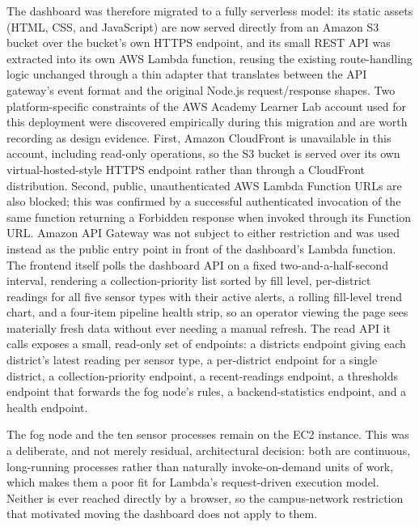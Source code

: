 \documentclass[conference]{IEEEtran}
\begin{document}
The dashboard was therefore migrated to a fully serverless model: its static assets (HTML, CSS, and JavaScript) are now served directly from an Amazon S3 bucket over the bucket's own HTTPS endpoint, and its small REST API was extracted into its own AWS Lambda function, reusing the existing route-handling logic unchanged through a thin adapter that translates between the API gateway's event format and the original Node.js request/response shapes. Two platform-specific constraints of the AWS Academy Learner Lab account used for this deployment were discovered empirically during this migration and are worth recording as design evidence. First, Amazon CloudFront is unavailable in this account, including read-only operations, so the S3 bucket is served over its own virtual-hosted-style HTTPS endpoint rather than through a CloudFront distribution. Second, public, unauthenticated AWS Lambda Function URLs are also blocked; this was confirmed by a successful authenticated invocation of the same function returning a Forbidden response when invoked through its Function URL. Amazon API Gateway \cite{ref15} was not subject to either restriction and was used instead as the public entry point in front of the dashboard's Lambda function. The frontend itself polls the dashboard API on a fixed two-and-a-half-second interval, rendering a collection-priority list sorted by fill level, per-district readings for all five sensor types with their active alerts, a rolling fill-level trend chart, and a four-item pipeline health strip, so an operator viewing the page sees materially fresh data without ever needing a manual refresh. The read API it calls exposes a small, read-only set of endpoints: a districts endpoint giving each district's latest reading per sensor type, a per-district endpoint for a single district, a collection-priority endpoint, a recent-readings endpoint, a thresholds endpoint that forwards the fog node's rules, a backend-statistics endpoint, and a health endpoint.

The fog node and the ten sensor processes remain on the EC2 instance. This was a deliberate, and not merely residual, architectural decision: both are continuous, long-running processes rather than naturally invoke-on-demand units of work, which makes them a poor fit for Lambda's request-driven execution model. Neither is ever reached directly by a browser, so the campus-network restriction that motivated moving the dashboard does not apply to them.
\end{document}
